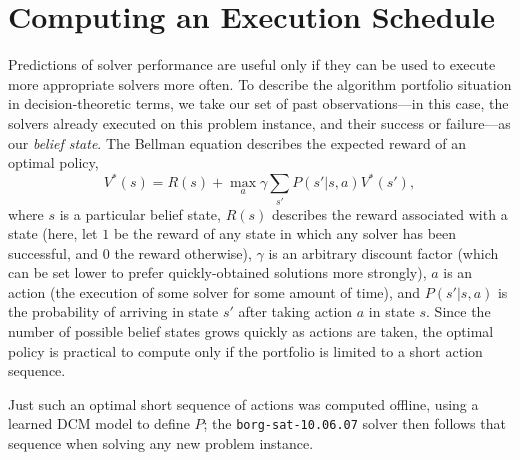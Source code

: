 \section{\label{sec:selection}Computing an Execution Schedule}

Predictions of solver performance are useful only if they can be used to
execute more appropriate solvers more often. To describe the algorithm
portfolio situation in decision-theoretic terms, we take our set of past
observations---in this case, the solvers already executed on this problem
instance, and their success or failure---as our \emph{belief state}. The
Bellman equation describes the expected reward of an optimal policy, \[ V^*(s)
= R(s) + \max_a \gamma \sum_{s'}P(s' | s, a) V^*(s'), \] where $s$ is a
particular belief state, $R(s)$ describes the reward associated with a state
(here, let $1$ be the reward of any state in which any solver has been
successful, and $0$ the reward otherwise), $\gamma$ is an arbitrary discount
factor (which can be set lower to prefer quickly-obtained solutions more
strongly), $a$ is an action (the execution of some solver for some amount of
time), and $P(s'|s,a)$ is the probability of arriving in state $s'$ after
taking action $a$ in state $s$.  Since the number of possible belief states
grows quickly as actions are taken, the optimal policy is practical to compute
only if the portfolio is limited to a short action sequence.

Just such an optimal short sequence of actions was computed offline, using a
learned DCM model to define $P$; the {\tt borg-sat-10.06.07} solver then
follows that sequence when solving any new problem instance.

